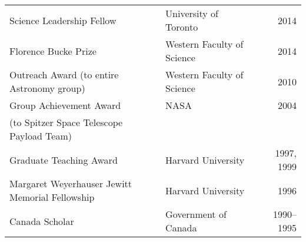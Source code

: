\begin{tabularx}{\textwidth}{lXr}
Science Leadership Fellow & University of Toronto & 2014 \\
Florence Bucke Prize& Western Faculty of Science & 2014\\
Outreach Award (to entire Astronomy group)& Western Faculty of Science & 2010 \\
Group Achievement Award & NASA  & 2004 \\
(to Spitzer Space Telescope Payload Team)& &\\
Graduate Teaching Award& Harvard University & 1997, 1999 \\
Margaret Weyerhauser Jewitt Memorial Fellowship& Harvard University & 1996\\
Canada Scholar & Government of Canada&1990--1995\\
\end{tabularx}
